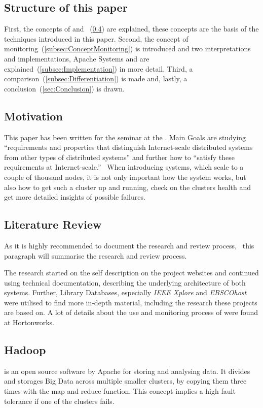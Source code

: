 \subsection{Structure of this paper}
First, the concepts of \hadoop and \mr~(\ref{subsec:Hadoop}) are explained, these concepts are the basis of the techniques introduced in this paper. 
Second, the concept of monitoring~(\ref{subsec:ConceptMonitoring}) is introduced and two interpretations and implementations, Apache Systems \amb and \chuk are explained~(\ref{subsec:Implementation}) in more detail. 
Third, a comparison~(\ref{subsec:Differentiation}) is made and, lastly, a conclusion~(\ref{sec:Conclusion}) is drawn.

\subsection{Motivation}
This paper has been written for the seminar \isdslong at the \tum. Main Goals are studying ``requirements and properties that distinguish Internet-scale distributed systems from other types of distributed systems'' and further how to ``satisfy these requirements at Internet-scale.''~\cite{SeminarInfo} 
When introducing systems, which scale to a couple of thousand nodes, it is not only important how the system works, but also how to get such a cluster up and running, check on the clusters health and get more detailed insights of possible failures.

\subsection{Literature Review}
As it is highly recommended to document the research and review process,~\cite{brocke09} this paragraph will summarise the research and review process.

The research started on the self description on the project websites and continued using technical documentation, describing the underlying architecture of both systems.
Further, Library Databases, especially \emph{IEEE Xplore} and \emph{EBSCOhost} were utilised to find more in-depth material, including the research these projects are based on. A lot of details about the use and monitoring process of \amb were found at Hortonworks.
	
\subsection{Hadoop}
\label{subsec:Hadoop}
\hadoopshort is an open source software by Apache for storing and analysing data.\cite{Dagli2014} It divides and storages Big Data across multiple smaller clusters, by copying them three times with the map and reduce function. This concept implies a high fault tolerance if one of the clusters fails.\cite{Dagli2014}

